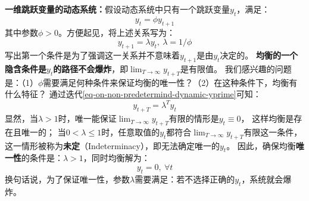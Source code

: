 \begin{example} \label{eg-one-non-predetermind}
    \textbf{一维跳跃变量的动态系统：}假设动态系统中只有一个跳跃变量$y_t$，满足：
    \begin{equation*}
        y_t = \phi y_{t+1}
    \end{equation*}
    其中参数$\phi>0$。方便起见，将上述关系写为：
    \begin{equation}    \label{eq-on-non-predetermind-dynamic-yprime}
        y_{t+1} = \lambda y_t, ~\lambda = 1/\phi
    \end{equation}
    写出第一个条件是为了强调这一关系并不意味着$y_{t+1}$是由$y_t$决定的。
    \textbf{均衡的一个隐含条件是$y_t$的路径不会爆炸}，即$\lim_{T\rightarrow \infty }y_{t+T}$是有限值。
    我们感兴趣的问题是：（1）$\phi$需要满足何种条件来保证均衡的唯一性？（2）在这种条件下，均衡有什么特征？
    通过迭代\cref{eq-on-non-predetermind-dynamic-yprime}可知：
    \begin{equation*}
        y_{t+T} = \lambda^T y_t 
    \end{equation*}
    显然，当$\lambda>1$时，唯一能保证$\lim_{T\rightarrow \infty }y_{t+T}$有限的情形是$y_t\equiv 0$，
    这样均衡是存在且唯一的；
    当$0<\lambda\leq 1$时，任意取值的$y_t$都符合$\lim_{T\rightarrow \infty }y_{t+T}$有限这一条件，
    这一情形被称为\textbf{未定}（Indeterminacy），即无法确定唯一的$y_t$。
    因此，确保均衡\textbf{唯一性}的条件是：$\lambda>1$，同时均衡解为：
    \begin{equation*}
        y_t = 0, ~\forall t
    \end{equation*}
    换句话说，为了保证唯一性，参数$\lambda$需要满足：若不选择正确的$y_t$，系统就会爆炸。
\end{example}

